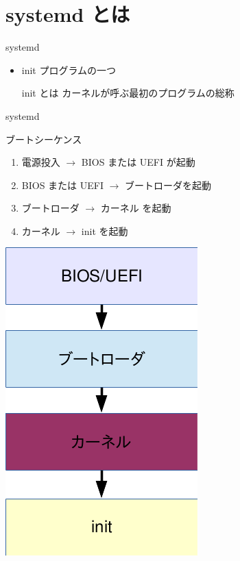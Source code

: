 \section{systemd とは}

\begin{frame}{systemd}
\begin{itemize}
\item init プログラムの一つ

      init とは カーネルが呼ぶ最初のプログラムの総称

      \end{itemize}
\end{frame}

\begin{frame}{systemd}

\begin{minipage}{0.55\hsize}
ブートシーケンス
\begin{enumerate}
\item 電源投入 $\rightarrow$ BIOS または UEFI が起動
\item BIOS または UEFI $\rightarrow$  ブートローダを起動
\item ブートローダ $\rightarrow$ カーネル を起動
\item カーネル $\rightarrow$ init を起動
\end{enumerate}
\end{minipage}
\begin{minipage}{0.39\hsize}
\includegraphics[width=0.8\hsize]{image201510/boot_seq.png}
\end{minipage}

\end{frame}


